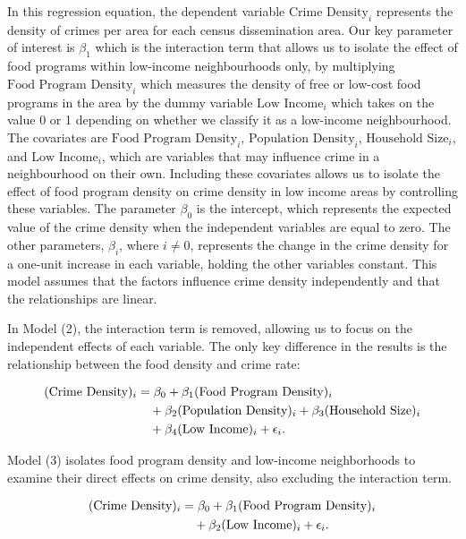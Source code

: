 \documentclass[AEJ]{AEA}
\begin{document}
In this regression equation, the dependent variable
$\text{Crime Density}_i$ represents the density of crimes per area for
each census dissemination area. Our key parameter of interest is
$\beta_1$ which is the interaction term that allows us to isolate the
effect of food programs within low-income neighbourhoods only, by
multiplying $\text{Food Program Density}_i$ which measures the density
of free or low-cost food programs in the area by the dummy variable
$\text{Low Income}_i$ which takes on the value 0 or 1 depending on
whether we classify it as a low-income neighbourhood. The covariates are
$\text{Food Program Density}_i$, $\text{Population Density}_i$,
$\text{Household Size}_i$, and $\text{Low Income}_i$, which are
variables that may influence crime in a neighbourhood on their own.
Including these covariates allows us to isolate the effect of food
program density on crime density in low income areas by controlling
these variables. The parameter $\beta_0$ is the intercept, which
represents the expected value of the crime density when the independent
variables are equal to zero. The other parameters, $\beta_i$, where
$i \neq 0$, represents the change in the crime density for a one-unit
increase in each variable, holding the other variables constant. This
model assumes that the factors influence crime density independently and
that the relationships are linear.

In Model (2), the interaction term is removed, allowing us to focus on the independent effects of each variable. The only key difference in the results is the relationship between the food density and crime rate:

\begin{align}
(\text{Crime Density})_i &= \beta_0 
+ \beta_1 (\text{Food Program Density})_i \notag \\
&\quad + \beta_2 (\text{Population Density})_i 
+ \beta_3 (\text{Household Size})_i \notag \\
&\quad + \beta_4 (\text{Low Income})_i
+ \epsilon_i.
\end{align}


Model (3) isolates food program density and low-income neighborhoods to examine their direct effects on crime density, also excluding the interaction term.

\begin{align}
(\text{Crime Density})_i &= \beta_0 
+ \beta_1 (\text{Food Program Density})_i \notag \\
&\quad + \beta_2 (\text{Low Income})_i+ \epsilon_i.
\end{align}
\end{document}
